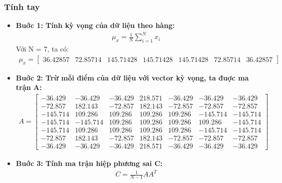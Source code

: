         \subsubsection{Tính tay}
            \begin{itemize}
                \item \textbf{Buớc 1: Tính kỳ vọng của dữ liệu theo hàng:}
                    \begin{align}
                        \mu_x = \frac{1}{N}\sum_{i=1}^{N}x_i
                    \end{align}
                    Với N = 7, ta có:
                    \begin{align*}
                        \mu_x = \begin{bmatrix}
                            36.42857 & 72.85714 & 145.71428 & 145.71428 & 145.71428 & 72.85714 & 36.42857 
                        \end{bmatrix}
                    \end{align*}
                \item \textbf{Buớc 2: Trừ mỗi điểm của dữ liệu với vector kỳ vọng, ta đuợc ma trận A:}
                    \begin{align*}
                        A = \begin{bmatrix}
                        -36.429 & -36.429 & -36.429 & 218.571 & -36.429 & -36.429 & -36.429 \\
                        -72.857 & 182.143 & -72.857 & 182.143 & -72.857 & -72.857 & -72.857 \\
                        -145.714 & 109.286 & 109.286 & 109.286 & 109.286 & -145.714 & -145.714 \\
                        -145.714 & -145.714 & 109.286 & 109.286 & 109.286 & 109.286 & -145.714 \\
                        -145.714 & 109.286 & 109.286 & 109.286 & 109.286 & -145.714 & -145.714 \\
                        -72.857 & 182.143 & -72.857 & 182.143 & -72.857 & -72.857 & -72.857 \\
                        -36.429 & -36.429 & -36.429 & 218.571 & -36.429 & -36.429 & -36.429
                        \end{bmatrix}
                    \end{align*}
                \item \textbf{Buớc 3: Tính ma trận hiệp phương sai C:}
                    \begin{align}
                        C = \frac{1}{N-1}AA^T

\end{align}
\end{itemize}
